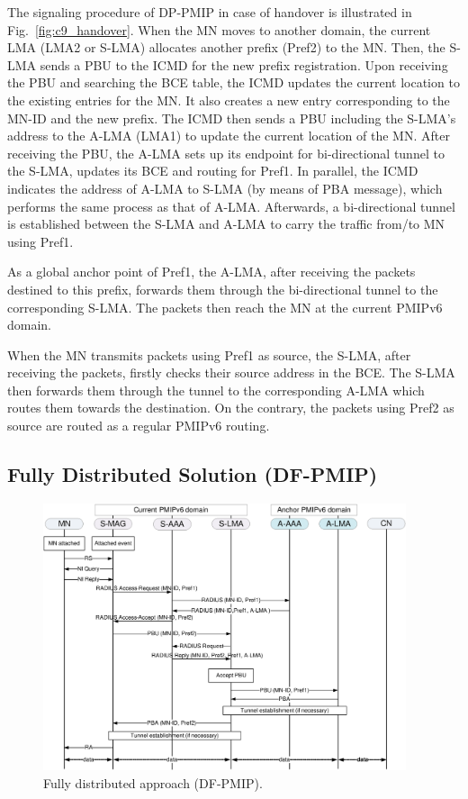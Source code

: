 The signaling procedure of DP-PMIP in case of handover is illustrated in Fig.~\ref{fig:c9_handover}. When the MN moves to another domain, the current LMA (LMA2 or S-LMA) allocates another prefix (Pref2) to the MN. Then, the S-LMA sends a PBU to the ICMD for the new prefix registration. Upon receiving the PBU and searching the BCE table, the ICMD updates the current location to the existing entries for the MN. It also creates a new entry corresponding to the MN-ID and the new prefix. The ICMD then sends a PBU including the S-LMA's address to the A-LMA (LMA1) to update the current location of the MN. After receiving the PBU, the A-LMA sets up its endpoint for bi-directional tunnel to the S-LMA, updates its BCE and routing for Pref1. In parallel, the ICMD indicates the address of A-LMA to S-LMA (by means of PBA message), which performs the same process as that of A-LMA. Afterwards, a bi-directional tunnel is established between the S-LMA and A-LMA to carry the traffic from/to MN using Pref1.

As a global anchor point of Pref1, the A-LMA, after receiving the packets destined to this prefix, forwards them through the bi-directional tunnel to the corresponding S-LMA. The packets then reach the MN at the current PMIPv6 domain. 

When the MN transmits packets using Pref1 as source, the S-LMA, after receiving the packets, firstly checks their source address in the BCE. The S-LMA then forwards them through the tunnel to the corresponding A-LMA which routes them towards the destination. On the contrary, the packets using Pref2 as source are routed as a regular PMIPv6 routing.

\subsection{Fully Distributed Solution (DF-PMIP)}
\begin{figure}[h!]
\centering
\includegraphics[width=0.95\textwidth]{./Part3/Chapter7/figures/c9_fully_distributed.eps}
\caption[Signaling for the fully distributed approach.]{Fully distributed approach (DF-PMIP).}
\label{fig:c9_fully_distributed}
\end{figure}

